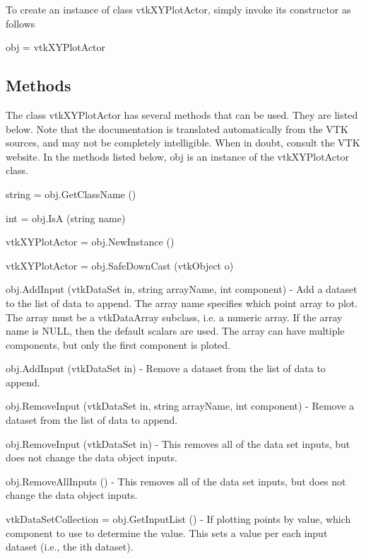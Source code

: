 To create an instance of class vtk\-X\-Y\-Plot\-Actor, simply invoke its constructor as follows \begin{DoxyVerb}  obj = vtkXYPlotActor
\end{DoxyVerb}
 \hypertarget{vtkwidgets_vtkxyplotwidget_Methods}{}\subsection{Methods}\label{vtkwidgets_vtkxyplotwidget_Methods}
The class vtk\-X\-Y\-Plot\-Actor has several methods that can be used. They are listed below. Note that the documentation is translated automatically from the V\-T\-K sources, and may not be completely intelligible. When in doubt, consult the V\-T\-K website. In the methods listed below, {\ttfamily obj} is an instance of the vtk\-X\-Y\-Plot\-Actor class. 
\begin{DoxyItemize}
\item {\ttfamily string = obj.\-Get\-Class\-Name ()}  
\item {\ttfamily int = obj.\-Is\-A (string name)}  
\item {\ttfamily vtk\-X\-Y\-Plot\-Actor = obj.\-New\-Instance ()}  
\item {\ttfamily vtk\-X\-Y\-Plot\-Actor = obj.\-Safe\-Down\-Cast (vtk\-Object o)}  
\item {\ttfamily obj.\-Add\-Input (vtk\-Data\-Set in, string array\-Name, int component)} -\/ Add a dataset to the list of data to append. The array name specifies which point array to plot. The array must be a vtk\-Data\-Array subclass, i.\-e. a numeric array. If the array name is N\-U\-L\-L, then the default scalars are used. The array can have multiple components, but only the first component is ploted.  
\item {\ttfamily obj.\-Add\-Input (vtk\-Data\-Set in)} -\/ Remove a dataset from the list of data to append.  
\item {\ttfamily obj.\-Remove\-Input (vtk\-Data\-Set in, string array\-Name, int component)} -\/ Remove a dataset from the list of data to append.  
\item {\ttfamily obj.\-Remove\-Input (vtk\-Data\-Set in)} -\/ This removes all of the data set inputs, but does not change the data object inputs.  
\item {\ttfamily obj.\-Remove\-All\-Inputs ()} -\/ This removes all of the data set inputs, but does not change the data object inputs.  
\item {\ttfamily vtk\-Data\-Set\-Collection = obj.\-Get\-Input\-List ()} -\/ If plotting points by value, which component to use to determine the value. This sets a value per each input dataset (i.\-e., the ith dataset).  

\end{DoxyItemize}
